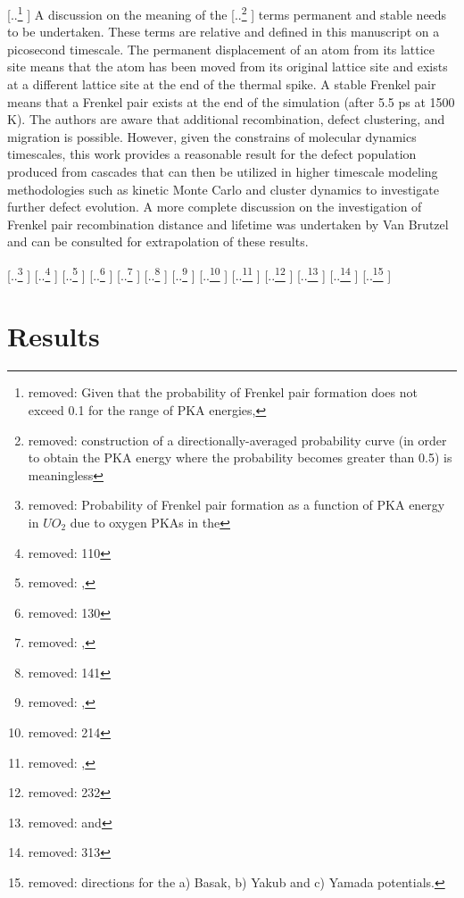 \documentclass[review]{elsarticle} %
\providecommand{\DIFaddtex}[1]{{\protect\color{blue} \sf #1}} %
\providecommand{\DIFdeltex}[1]{{\protect\color{red} [..\footnote{removed: #1} ]}} %
\providecommand{\DIFaddbegin}{} %
\providecommand{\DIFaddend}{} %
\providecommand{\DIFdelbegin}{} %
\providecommand{\DIFdelend}{} %
\providecommand{\DIFdelFL}[1]{\DIFdel{#1}} %
\providecommand{\DIFadd}[1]{\texorpdfstring{\DIFaddtex{#1}}{#1}} %
\providecommand{\DIFdel}[1]{\texorpdfstring{\DIFdeltex{#1}}{}} %
\newcommand{\DIFscaledelfig}{0.5}
\newlength{\DIFdelgraphicswidth} %
\newlength{\DIFdelgraphicsheight} %
\newcommand{\DIFaddincludegraphics}[2][]{{\color{blue}\fbox{\DIFOincludegraphics[#1]{#2}}}} %
\newcommand{\DIFdelincludegraphics}[2][]{%
\sbox{\DIFdelgraphicsbox}{\DIFOincludegraphics[#1]{#2}}%
\settoboxwidth{\DIFdelgraphicswidth}{\DIFdelgraphicsbox} %
\settoboxtotalheight{\DIFdelgraphicsheight}{\DIFdelgraphicsbox} %
\scalebox{\DIFscaledelfig}{%
\parbox[b]{\DIFdelgraphicswidth}{\usebox{\DIFdelgraphicsbox}\\[-\baselineskip] \rule{\DIFdelgraphicswidth}{0em}}\llap{\resizebox{\DIFdelgraphicswidth}{\DIFdelgraphicsheight}{%
\setlength{\unitlength}{\DIFdelgraphicswidth}%
\begin{picture}(1,1)%
\thicklines\linethickness{2pt} %
{\color[rgb]{1,0,0}\put(0,0){\framebox(1,1){}}}%
{\color[rgb]{1,0,0}\put(0,0){\line( 1,1){1}}}%
{\color[rgb]{1,0,0}\put(0,1){\line(1,-1){1}}}%
\end{picture}%
}\hspace*{3pt}}} %
} %
\DeclareRobustCommand{\DIFaddbegin}{\DIFOaddbegin \let\includegraphics\DIFaddincludegraphics} %
\DeclareRobustCommand{\DIFaddend}{\DIFOaddend \let\includegraphics\DIFOincludegraphics} %
\DeclareRobustCommand{\DIFdelbegin}{\DIFOdelbegin \let\includegraphics\DIFdelincludegraphics} %
\DeclareRobustCommand{\DIFdelend}{\DIFOaddend \let\includegraphics\DIFOincludegraphics} %
\begin{document}
\DIFdelbegin \DIFdel{Given that the probability of Frenkel pair formation does not exceed 0.1 for the range of PKA energies, }\DIFdelend \DIFaddbegin \DIFadd{A discussion on the meaning of }\DIFaddend the \DIFdelbegin \DIFdel{construction of a directionally-averaged probability curve (in order to obtain the PKA energy where the probability becomes greater than 0.5) is meaningless}\DIFdelend \DIFaddbegin \DIFadd{terms permanent and stable needs to be undertaken. These terms are relative and defined in this manuscript on a picosecond timescale. The permanent displacement of an atom from its lattice site means that the atom has been moved from its original lattice site and exists at a different lattice site at the end of the thermal spike. A stable Frenkel pair means that a Frenkel pair exists at the end of the simulation (after 5.5 ps at 1500 K). The authors are aware that additional recombination, defect clustering, and migration is possible. However, given the constrains of molecular dynamics timescales, this work provides a reasonable result for the defect population produced from cascades that can then be utilized in higher timescale modeling methodologies such as kinetic Monte Carlo and cluster dynamics to investigate further defect evolution. A more complete discussion on the investigation of Frenkel pair recombination distance and lifetime was undertaken by Van Brutzel \cite{vanbrutzel2008} and can be consulted for extrapolation of these results}\DIFaddend .

\DIFdelbegin %
{%
\DIFdelFL{Probability of Frenkel pair formation as a function of PKA energy in $UO_2$ due to oxygen PKAs in the }%
\DIFdelFL{110}%
\DIFdelFL{, }%
\DIFdelFL{130}%
\DIFdelFL{, }%
\DIFdelFL{141}%
\DIFdelFL{, }%
\DIFdelFL{214}%
\DIFdelFL{, }%
\DIFdelFL{232}%
\DIFdelFL{and }%
\DIFdelFL{313}%
\DIFdelFL{directions for the a) Basak, b) Yakub and c) Yamada potentials.  }}

\DIFdelend \FloatBarrier

\DIFaddbegin \section{\DIFadd{Results}}
\end{document}

